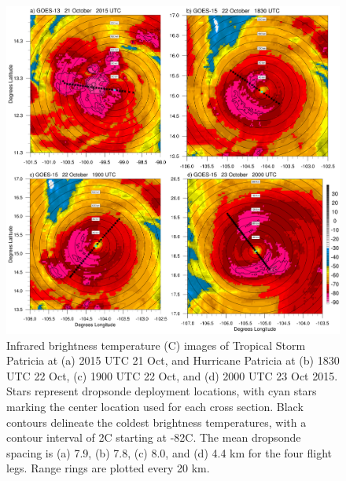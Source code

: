 \begin{figure}[ht]
\centerline{\includegraphics[width=39pc]{figures/fig01_patricia_ir.png}}
\caption{Infrared brightness temperature (\textdegree{}C) images of Tropical Storm Patricia at (a) 2015 UTC 21 Oct, and Hurricane Patricia at (b) 1830 UTC 22 Oct, (c) 1900 UTC 22 Oct, and (d) 2000 UTC 23 Oct 2015. Stars represent dropsonde deployment locations, with cyan stars marking the center location used for each cross section. Black contours delineate the coldest brightness temperatures, with a contour interval of 2\textdegree{}C starting at -82\textdegree{}C. The mean dropsonde spacing is (a) 7.9, (b) 7.8, (c) 8.0, and (d) 4.4 km for the four flight legs. Range rings are plotted every 20 km.}
\label{fig:patricia_ir}
\end{figure}

